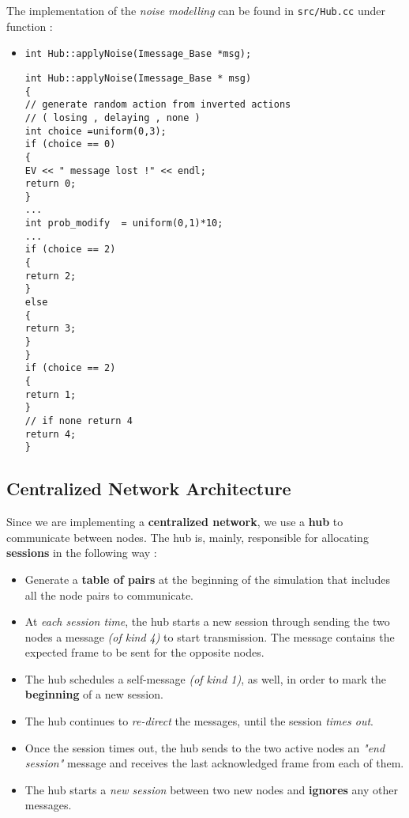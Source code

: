 The implementation of the \emph{noise modelling} can be found in \texttt{src/Hub.cc} under function :
\begin{itemize}
    \item \texttt{int Hub::applyNoise(Imessage\_Base *msg);}
    \begin{verbatim}
int Hub::applyNoise(Imessage_Base * msg)
{
// generate random action from inverted actions 
// ( losing , delaying , none )
int choice =uniform(0,3);
if (choice == 0)
{
EV << " message lost !" << endl;
return 0;
}
...
int prob_modify  = uniform(0,1)*10;
...
if (choice == 2)
{
return 2;
}
else
{
return 3;
}
}
if (choice == 2)
{
return 1;
}
// if none return 4
return 4;
}
    \end{verbatim}
\end{itemize}

\subsection{Centralized Network Architecture}
Since we are implementing a \textbf{centralized network}, we use a \textbf{hub} to communicate between nodes. The hub is, mainly, responsible for allocating \textbf{sessions} in the following way :
\begin{itemize}
    \item Generate a \textbf{table of pairs} at the beginning of the simulation that includes all the node pairs to communicate.
    \item At \emph{each session time}, the hub starts a new session through sending the two nodes a message \emph{(of kind 4)} to start transmission. The message contains the expected frame to be sent for the opposite nodes.
    \item The hub schedules a self-message \emph{(of kind 1)}, as well, in order to mark the \textbf{beginning} of a new session.
    \item The hub continues to \emph{re-direct} the messages, until the session \emph{times out}.
    \item Once the session times out, the hub sends to the two active nodes an \textit{"end session"} message and receives the last acknowledged frame from each of them.
    \item The hub starts a \emph{new session} between two new nodes and \textbf{ignores} any other messages.
\end{itemize}

